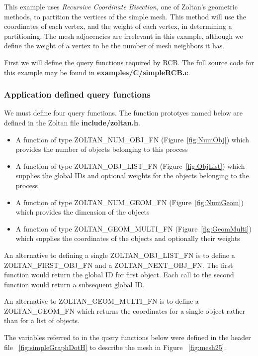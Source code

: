 This example uses \emph{Recursive Coordinate Bisection}, 
one of Zoltan's geometric methods, to partition
the vertices of the simple mesh.  This method will use
the coordinates of each vertex, and the weight of each
vertex, in determining a partitioning.  The mesh adjacencies are
irrelevant in this example, although we define the weight of
a vertex to be the number of mesh neighbors it has.

First we will define the query functions required by RCB.
The full source code for this example may be found in
\textbf{examples/C/simpleRCB.c}.

\subsubsection{Application defined query functions}

We must define four query functions.  The function prototyes named 
below are defined in the Zoltan file \textbf{include/zoltan.h}.

\begin{itemize}
\item A function of type ZOLTAN\_NUM\_OBJ\_FN (Figure~\ref{fig:NumObj}) which provides the number of objects belonging to this process 
\item A function of type ZOLTAN\_OBJ\_LIST\_FN (Figure~\ref{fig:ObjList}) which supplies the global IDs and optional weights for the objects belonging to the process
\item A function of type ZOLTAN\_NUM\_GEOM\_FN (Figure~\ref{fig:NumGeom}) which provides the dimension of the objects
\item A function of type ZOLTAN\_GEOM\_MULTI\_FN (Figure~\ref{fig:GeomMulti}) which supplies the coordinates of the objects and optionally their weights
\end{itemize}

An alternative to defining a single ZOLTAN\_OBJ\_LIST\_FN is to define
a ZOLTAN\_FIRST\_OBJ\_FN and a ZOLTAN\_NEXT\_OBJ\_FN.  The first function
would return the global ID for first object.  Each call to the second function would
return a subsequent global ID.

An alternative to ZOLTAN\_GEOM\_MULTI\_FN is to define a ZOLTAN\_GEOM\_FN which
returns the coordinates for a single object rather than for a list
of objects.

The variables referred to in the query functions below were defined in the header
file ~\ref{fig:simpleGraphDotH} to describe the mesh in Figure ~\ref{fig:mesh25}.


